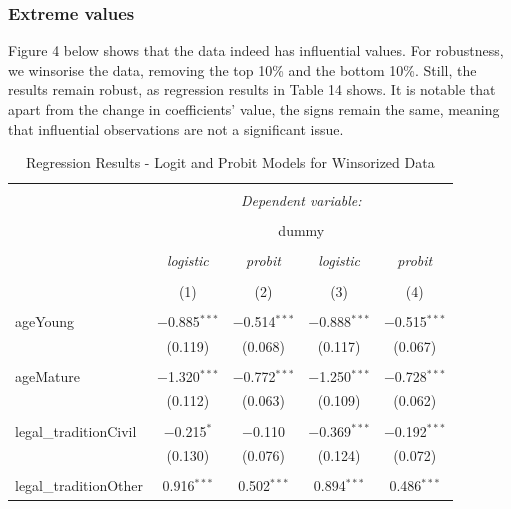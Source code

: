 \documentclass[a4paper, nobind]{templates/ociamthesis}
\begin{document}
\hypertarget{extreme-values}{%
\subsubsection{Extreme values}\label{extreme-values}}

Figure 4 below shows that the data indeed has influential values. For robustness, we winsorise the data, removing the top 10\% and the bottom 10\%. Still, the results remain robust, as regression results in Table 14 shows. It is notable that apart from the change in coefficients' value, the signs remain the same, meaning that influential observations are not a significant issue.

\begin{table}[!htbp] \centering 
  \caption{Regression Results - Logit and Probit Models for Winsorized Data} 
  \label{} 
\footnotesize 
\begin{tabular}{@{\extracolsep{5pt}}lcccc} 
\\[-1.8ex]\hline 
\hline \\[-1.8ex] 
 & \multicolumn{4}{c}{\textit{Dependent variable:}} \\ 
\cline{2-5} 
\\[-1.8ex] & \multicolumn{4}{c}{dummy} \\ 
\\[-1.8ex] & \textit{logistic} & \textit{probit} & \textit{logistic} & \textit{probit} \\ 
\\[-1.8ex] & (1) & (2) & (3) & (4)\\ 
\hline \\[-1.8ex] 
 ageYoung & $-$0.885$^{***}$ & $-$0.514$^{***}$ & $-$0.888$^{***}$ & $-$0.515$^{***}$ \\ 
  & (0.119) & (0.068) & (0.117) & (0.067) \\ 
  & & & & \\ 
 ageMature & $-$1.320$^{***}$ & $-$0.772$^{***}$ & $-$1.250$^{***}$ & $-$0.728$^{***}$ \\ 
  & (0.112) & (0.063) & (0.109) & (0.062) \\ 
  & & & & \\ 
 legal\_traditionCivil & $-$0.215$^{*}$ & $-$0.110 & $-$0.369$^{***}$ & $-$0.192$^{***}$ \\ 
  & (0.130) & (0.076) & (0.124) & (0.072) \\ 
  & & & & \\ 
 legal\_traditionOther & 0.916$^{***}$ & 0.502$^{***}$ & 0.894$^{***}$ & 0.486$^{***}$ \\ 

\end{tabular}
\end{table}
\end{document}
